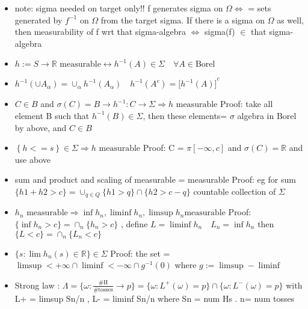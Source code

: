 \documentclass[10pt,landscape,a4paper]{article}
\begin{document}
\begin{multicols*}{3}
\begin{spacing}{0.5}

\begin{itemize}

\item note: sigma needed on target only!! f generates sigma on $\Omega \Leftrightarrow$ = sets generated by $f^{-1}$ on $\Omega$ from the target sigma. If there is a sigma on $\Omega$ as well, then measurability of f wrt that sigma-algebra $\Leftrightarrow$ sigma(f) $\in$ that sigma-algebra 

\item $ h := S \rightarrow \mathbb{R} \text{ measurable} \leftrightarrow h^{-1}(A) \in \Sigma \quad \forall A \in \text{Borel}$
\item $  h^{-1}(\cup A_{\alpha}) = \cup_{\alpha} h^{-1}(A_{\alpha}) \quad h^{-1}(A^c) = { \big[ h^{-1}(A) \big]}^c$
\item $ C \in B $ and $ \sigma(C) = B \rightarrow h^{-1} : C \rightarrow \Sigma \Rightarrow h \text{ measurable} $ Proof: take all element B such that $h^{-1}(B) \in \Sigma$, then these elements= $\sigma$ algebra in Borel by above, and $C \in B$
\item  $ \left\lbrace h <= s \right\rbrace \in \Sigma \Rightarrow h \text{ measurable}$ Proof: C = $\pi [-\infty,c]$ and $\sigma(C) = \mathbb{R}$ and use above
\item  sum and product and scaling of measurable = measurable Proof: eg for sum $ \{h1+h2 > c \} = \cup_{q \in Q} \{h1 > q\} \cap  \{h2 > c-q  \}  $ countable collection of $\Sigma$
\item   $ \boxed{ h_n \text{ measurable} \Rightarrow \inf h_n , \liminf h_n, \limsup h_n \text{measurable} } $ Proof: $ \{ \inf h_n > c \} = \cap_n \{ h_n > c \} $ , define $ L =\liminf h_n \quad L_n = \inf h_n   $ then $ \{ L < c \} = \cap_n  \{ L_n < c \}$
\item $ \boxed { \{ s : \lim h_n(s) \in \mathbb{R} \} \in \Sigma } $ Proof: the set = $ \limsup < + \infty \cap \liminf < - \infty \cap g^{-1} (0) $ where $ g := \limsup - \liminf $
\item  Strong law : $\Lambda = \{ \omega : \frac{\text{\#H}}{\text{\#tosses}} \rightarrow p \} = \{ \omega : L^+ (\omega) = p \} \cap \{ \omega : L^- (\omega) = p \} $ with L+ = limsup Sn/n , L- = liminf Sn/n where Sn = num Hs . n= num tosses



\end{itemize}
\end{spacing}
\end{multicols*}
\end{document}
